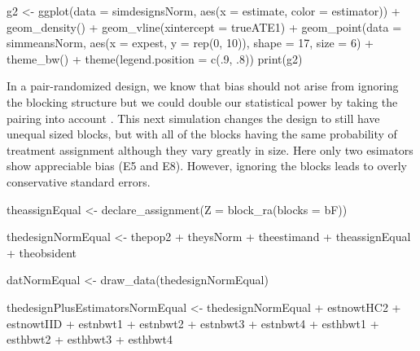 \documentclass[
  12pt,
]{book}
\newenvironment{Shaded}{\begin{snugshade}}{\end{snugshade}}
\newcommand{\AttributeTok}[1]{\textcolor[rgb]{0.77,0.63,0.00}{#1}}
\newcommand{\DecValTok}[1]{\textcolor[rgb]{0.00,0.00,0.81}{#1}}
\newcommand{\FunctionTok}[1]{\textcolor[rgb]{0.00,0.00,0.00}{#1}}
\newcommand{\NormalTok}[1]{#1}
\newcommand{\OtherTok}[1]{\textcolor[rgb]{0.56,0.35,0.01}{#1}}
\newcommand{\SpecialCharTok}[1]{\textcolor[rgb]{0.00,0.00,0.00}{#1}}
\theoremstyle{definition}
\theoremstyle{definition}
\theoremstyle{definition}
\theoremstyle{remark}
\begin{document}
\begin{Shaded}
\begin{Highlighting}[]
\NormalTok{g2 }\OtherTok{\textless{}{-}} \FunctionTok{ggplot}\NormalTok{(}\AttributeTok{data =}\NormalTok{ simdesignsNorm, }\FunctionTok{aes}\NormalTok{(}\AttributeTok{x =}\NormalTok{ estimate, }\AttributeTok{color =}\NormalTok{ estimator)) }\SpecialCharTok{+}
  \FunctionTok{geom\_density}\NormalTok{() }\SpecialCharTok{+}
  \FunctionTok{geom\_vline}\NormalTok{(}\AttributeTok{xintercept =}\NormalTok{ trueATE1) }\SpecialCharTok{+}
  \FunctionTok{geom\_point}\NormalTok{(}\AttributeTok{data =}\NormalTok{ simmeansNorm, }\FunctionTok{aes}\NormalTok{(}\AttributeTok{x =}\NormalTok{ expest, }\AttributeTok{y =} \FunctionTok{rep}\NormalTok{(}\DecValTok{0}\NormalTok{, }\DecValTok{10}\NormalTok{)), }\AttributeTok{shape =} \DecValTok{17}\NormalTok{, }\AttributeTok{size =} \DecValTok{6}\NormalTok{) }\SpecialCharTok{+}
  \FunctionTok{theme\_bw}\NormalTok{() }\SpecialCharTok{+}
  \FunctionTok{theme}\NormalTok{(}\AttributeTok{legend.position =} \FunctionTok{c}\NormalTok{(.}\DecValTok{9}\NormalTok{, .}\DecValTok{8}\NormalTok{))}
\FunctionTok{print}\NormalTok{(g2)}
\end{Highlighting}
\end{Shaded}

In a pair-randomized design, we know that bias should not arise from
ignoring the blocking structure but we could double our statistical
power by taking the pairing into account \citep{bowers2011mem}. This
next simulation changes the design to still have unequal sized blocks,
but with all of the blocks having the same probability of treatment
assignment although they vary greatly in size. Here only two esimators
show appreciable bias (E5 and E8). However, ignoring the blocks leads to
overly conservative standard errors.

\begin{Shaded}
\begin{Highlighting}[]
\NormalTok{theassignEqual }\OtherTok{\textless{}{-}} \FunctionTok{declare\_assignment}\NormalTok{(}\AttributeTok{Z =} \FunctionTok{block\_ra}\NormalTok{(}\AttributeTok{blocks =}\NormalTok{ bF))}

\NormalTok{thedesignNormEqual }\OtherTok{\textless{}{-}}\NormalTok{ thepop2 }\SpecialCharTok{+}\NormalTok{ theysNorm }\SpecialCharTok{+}\NormalTok{ theestimand }\SpecialCharTok{+}\NormalTok{ theassignEqual }\SpecialCharTok{+}\NormalTok{ theobsident}

\NormalTok{datNormEqual }\OtherTok{\textless{}{-}} \FunctionTok{draw\_data}\NormalTok{(thedesignNormEqual)}

\NormalTok{thedesignPlusEstimatorsNormEqual }\OtherTok{\textless{}{-}}\NormalTok{ thedesignNormEqual }\SpecialCharTok{+}
\NormalTok{  estnowtHC2 }\SpecialCharTok{+}\NormalTok{ estnowtIID }\SpecialCharTok{+}\NormalTok{ estnbwt1 }\SpecialCharTok{+}\NormalTok{ estnbwt2 }\SpecialCharTok{+}\NormalTok{ estnbwt3 }\SpecialCharTok{+}\NormalTok{ estnbwt4 }\SpecialCharTok{+}
\NormalTok{  esthbwt1 }\SpecialCharTok{+}\NormalTok{ esthbwt2 }\SpecialCharTok{+}\NormalTok{ esthbwt3 }\SpecialCharTok{+}\NormalTok{ esthbwt4}
\end{Highlighting}
\end{Shaded}
\end{document}
